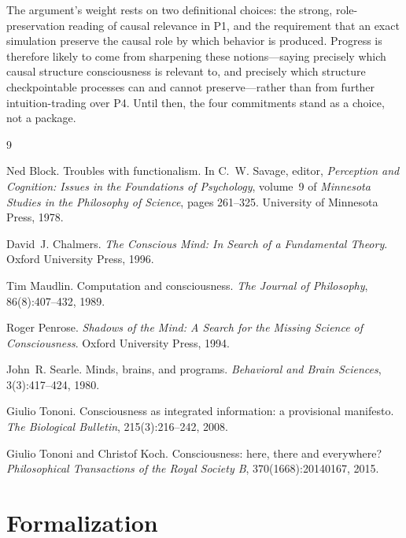 \documentclass[11pt]{article}
\begin{document}
The argument's weight rests on two definitional choices: the strong,
role-preservation reading of causal relevance in P1, and the requirement that
an exact simulation preserve the causal role by which behavior is produced.
Progress is therefore likely to come from sharpening these notions---saying
precisely which causal structure consciousness is relevant to, and precisely
which structure checkpointable processes can and cannot preserve---rather than
from further intuition-trading over P4. Until then, the four commitments stand
as a choice, not a package.

\begin{thebibliography}{9}

  Ned Block.
  Troubles with functionalism.
  In C.~W. Savage, editor, \emph{Perception and Cognition: Issues in the
    Foundations of Psychology}, volume~9 of \emph{Minnesota Studies in the
    Philosophy of Science}, pages 261--325. University of Minnesota Press,
  1978.

  David~J. Chalmers.
  \emph{The Conscious Mind: In Search of a Fundamental Theory}.
  Oxford University Press, 1996.

  Tim Maudlin.
  Computation and consciousness.
  \emph{The Journal of Philosophy}, 86(8):407--432, 1989.

  Roger Penrose.
  \emph{Shadows of the Mind: A Search for the Missing Science of
    Consciousness}.
  Oxford University Press, 1994.

  John~R. Searle.
  Minds, brains, and programs.
  \emph{Behavioral and Brain Sciences}, 3(3):417--424, 1980.

  Giulio Tononi.
  Consciousness as integrated information: a provisional manifesto.
  \emph{The Biological Bulletin}, 215(3):216--242, 2008.

  Giulio Tononi and Christof Koch.
  Consciousness: here, there and everywhere?
  \emph{Philosophical Transactions of the Royal Society B},
  370(1668):20140167, 2015.

\end{thebibliography}

\appendix

\section{Formalization}
\label{app:formal}
\end{document}
